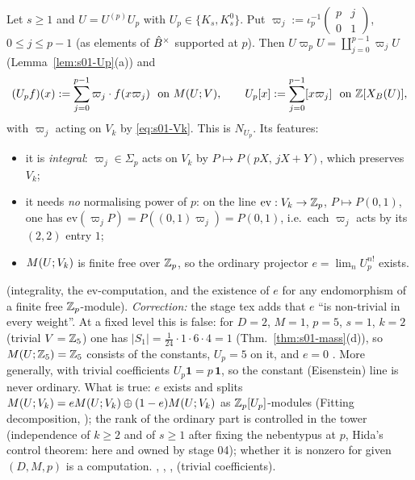 \begin{definition}\label{def:s01-NUp}
Let $s\ge1$ and $U=U^{(p)}U_p$ with $U_p\in\{K_s,K^0_s\}$. Put $\varpi_j:=\iota_p^{-1}\left(\begin{smallmatrix}p&j\\0&1\end{smallmatrix}\right)$,
$0\le j\le p-1$ (as elements of $\hat{B}^\times$ supported at $p$). Then $U\varpi_pU=\coprod_{j=0}^{p-1}\varpi_jU$
(Lemma~\ref{lem:s01-Up}(a)) and
\[(U_pf)(x):=\sum_{j=0}^{p-1}\varpi_j\cdot f(x\varpi_j)\ \ \text{on }M(U;V),\qquad U_p[x]:=\sum_{j=0}^{p-1}[x\varpi_j]\ \ \text{on }\mathbb{Z}[X_B(U)],\]
with $\varpi_j$ acting on $V_k$ by \eqref{eq:s01-Vk}. This is $N_{U_p}$. Its features:
\begin{itemize}
\item it is \emph{integral}: $\varpi_j\in\Sigma_p$ acts on $V_k$ by $P\mapsto P(pX,\,jX+Y)$, which preserves $V_k$;
\item it needs \emph{no} normalising power of $p$: on the line $\mathrm{ev}:V_k\to\mathbb{Z}_p$, $P\mapsto P(0,1)$, one has
  $\mathrm{ev}(\varpi_jP)=P((0,1)\varpi_j)=P(0,1)$, i.e.\ each $\varpi_j$ acts by its $(2,2)$ entry $1$;
\item $M(U;V_k)$ is finite free over $\mathbb{Z}_p$, so the ordinary projector $e=\lim_nU_p^{n!}$ exists.
\end{itemize}
\stproved{} (integrality, the $\mathrm{ev}$-computation, and the existence of $e$ for any endomorphism of a finite free $\mathbb{Z}_p$-module).
\emph{Correction:} the stage tex adds that $e$ ``is non-trivial in every weight''. At a fixed level this is false: for
$D=2$, $M=1$, $p=5$, $s=1$, $k=2$ (trivial $V=\mathbb{Z}_5$) one has $|S_1|=\frac{1}{24}\cdot1\cdot6\cdot4=1$ (Thm.~\ref{thm:s01-mass}(d)), so
$M(U;\mathbb{Z}_5)=\mathbb{Z}_5$ consists of the constants, $U_p=5$ on it, and $e=0$ \stproved. More generally, with trivial coefficients
$U_p\mathbf 1=p\,\mathbf 1$, so the constant (Eisenstein) line is never ordinary. What is true: $e$ exists and splits
$M(U;V_k)=eM(U;V_k)\oplus(1-e)M(U;V_k)$ as $\mathbb{Z}_p[U_p]$-modules (Fitting decomposition, \stproved); the
rank of the ordinary part is controlled in the tower (independence of $k\ge2$ and of $s\ge1$ after fixing the nebentypus at $p$,
Hida's control theorem: \stexp{} here and owned by stage 04); whether it is nonzero for given $(D,M,p)$ is a computation.
, , ,
 \stformal{} (trivial coefficients).
\end{definition}

